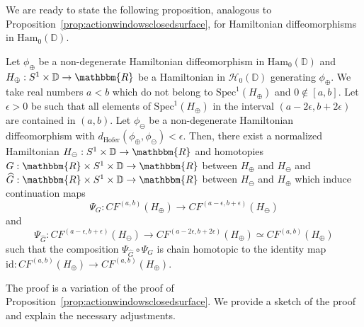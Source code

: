 \documentclass[AHL,Unicode,longabstracts,published]{cedram}
\newcommand{\R}{\mathbbm{R}}
\newcommand{\D}{\mathbb{D}}
\newcommand{\Ham}{\mathrm{Ham}}
\newcommand{\hofer}{\mathrm{Hofer}}
\newcommand{\Spec}{\mathrm{Spec}}
\newcommand{\rid}{\mathrm{id}}
\newcommand{\clH}{\mathcal{H}}
\newcommand{\hofer}{\mathrm{Hofer}}
\begin{document}
We are ready to state the following proposition, analogous to Proposition~\ref{prop:actionwindowsclosedsurface}, for Hamiltonian diffeomorphisms in $\Ham_0(\D)$.


\begin{prop}\label{prop:chainisodisk0}
Let $\phi_\oplus$ be a non-degenerate Hamiltonian diffeomorphism in \linebreak $\Ham_0(\D)$ and $H_\oplus:S^1 \times \D \to \R$ be a Hamiltonian in $\clH_0(\D)$ generating $\phi_\oplus$. We take real numbers $a<b$ which do not belong to $\Spec^1(H_\oplus)$ and $0 \notin [a,b]$. Let $\epsilon>0$ be such that all elements of $\Spec^1(H_\oplus)$ in the interval $(a-2\epsilon, b+2\epsilon)$ are contained in $(a,b)$. Let $\phi_\ominus$ be a non-degenerate Hamiltonian diffeomorphism with $d_{\hofer}(\phi_\oplus, \phi_\ominus)< \epsilon$. Then, there exist a normalized Hamiltonian $H_\ominus: S^1 \times \D \to \R $ and homotopies $G: \R \times S^1 \times \D \to \R $ between $H_\oplus$ and $H_\ominus$ and $\widehat{G}: \R \times S^1 \times \D \to \R $ between $H_\ominus$ and $H_\oplus$ which induce continuation maps
\[
\Psi_G: CF^{(a,b)}(H_\oplus) \to CF^{(a-\epsilon, b+\epsilon)}(H_\ominus)
\]
and
\[
\Psi_{\widehat{G}}: CF^{(a-\epsilon, b+\epsilon)}(H_\ominus) \to CF^{(a-2\epsilon,b+2\epsilon)}(H_\oplus) \simeq CF^{(a,b)}(H_\oplus)
\]
such that the composition $\Psi_{\widehat{G}}\circ \Psi_G$ is chain homotopic to the identity map ${\rid}: CF^{(a,b)}(H_\oplus) \to CF^{(a,b)}(H_\oplus) $.
\end{prop}

The proof is a variation of the proof of Proposition~\ref{prop:actionwindowsclosedsurface}. We provide a sketch of the proof and explain the necessary adjustments.
\end{document}
